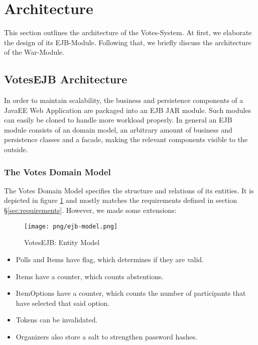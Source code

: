 \section{Architecture}
\label{sec:architecture}
This section outlines the architecture of the Votes-System.
At first, we elaborate the design of its EJB-Module.
Following that, we briefly discuss the architecture of the War-Module.


\subsection{VotesEJB Architecture}
\label{subsec:votesejb-architector}
In order to maintain scalability, the business and persistence components of a JavaEE Web Application are packaged into an EJB JAR module.
Such modules can easily be cloned to handle more workload properly.
In general an EJB module consists of an domain model, an arbitrary amount of business and persistence classes and a facade, making the relevant components visible to the outside.

\subsubsection{The Votes Domain Model}
\label{subsubsec:the-votes-domain-model}
The Votes Domain Model specifies the structure and relations of its entities.
It is depicted in figure \ref{figure:ejb-model} and mostly matches the requirements defined in section §\ref{sec:requirements}.
However, we made some extensions:

\begin{figure}[h]
\centering
\texttt{[image: png/ejb-model.png]}
\caption{VotesEJB: Entity Model}
\label{figure:ejb-model}
\end{figure}

\begin{itemize}

\item
Polls and Items have flag, which determines if they are valid.

\item
Items have a counter, which counts abstentions.

\item
ItemOptions have a counter, which counts the number of participants that have selected that said option.

\item
Tokens can be invalidated.

\item
Organizers also store a salt to strengthen password hashes.

\end{itemize}



